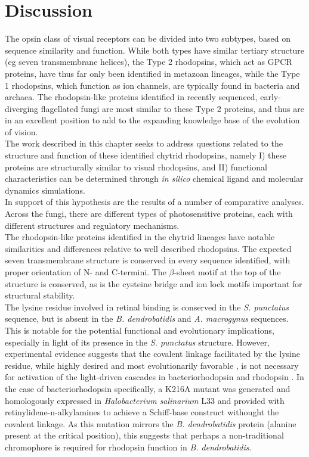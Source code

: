 \section{Discussion}
The opsin class of visual receptors can be divided into two subtypes, based on sequence similarity and function. While both types have similar tertiary structure (eg seven transmembrane helices), the Type 2 rhodopsins, which act as GPCR proteins, have thus far only been identified in metazoan lineages, while the Type 1 rhodopsins, which function as ion channels, are typically found in bacteria and archaea. The rhodopsin-like proteins identified in recently sequenced, early-diverging flagellated fungi are most similar to these Type 2 proteins, and thus are in an excellent position to add to the expanding knowledge base of the evolution of vision.\\
\indent The work described in this chapter seeks to address questions related to the structure and function of these identified chytrid rhodopsins, namely I) these proteins are structurally similar to visual rhodopsins, and II) functional characteristics can be determined through \textit{in silico} chemical ligand and molecular dynamics simulations.\\
\indent In support of this hypothesis are the results of a number of comparative analyses. Across the fungi, there are different types of photosensitive proteins, each with different structures and regulatory mechanisms.\\
\indent The rhodopsin-like proteins identified in the chytrid lineages have notable similarities and differences relative to well described rhodopsins. The expected seven transmembrane structure is conserved in every sequence identified, with proper orientation of N- and C-termini. The $\beta$-sheet motif at the top of the structure is conserved, as is the cysteine bridge and ion lock motifs important for structural stability.\\
\indent The lysine residue involved in retinal binding is conserved in the \textit{S. punctatus} sequence, but is absent in the \textit{B. dendrobatidis} and \textit{A. macrogynus} sequences. This is notable for the potential functional and evolutionary implications, especially in light of its presence in the \textit{S. punctatus} structure. However, experimental evidence suggests that the covalent linkage facilitated by the lysine residue, while highly desired and most evolutionarily favorable \cite{Sekharan2011}, is not necessary for activation of the light-driven cascades in bacteriorhodopsin \cite{Schweiger1994} and rhodopsin \cite{Zhukovsky1992}. In the case of bacteriorhodopsin specifically, a K216A mutant was generated and homologously expressed in \textit{Halobacterium salinarium} L33 and provided with retinylidene-n-alkylamines to achieve a Schiff-base construct withought the covalent linkage. As this mutation mirrors the \textit{B. dendrobatidis} protein (alanine present at the critical position), this suggests that perhaps a non-traditional chromophore is required for rhodopsin function in \textit{B. dendrobatidis}.\\
